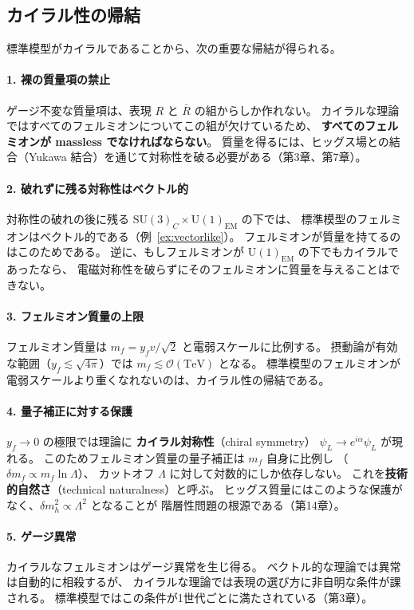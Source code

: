 \documentclass[uplatex,dvipdfmx,a4paper,11pt,openany]{jsbook}
\newcommand{\term}[2]{\textbf{#1}（#2）}
\numberwithin{equation}{chapter}
\theoremstyle{definition}
\theoremstyle{plain}
\theoremstyle{remark}
\newcommand{\SU}{\mathrm{SU}}
\newcommand{\U}{\mathrm{U}}
\begin{document}
\subsection{カイラル性の帰結}
標準模型がカイラルであることから、次の重要な帰結が得られる。
\paragraph{1. 裸の質量項の禁止}
ゲージ不変な質量項は、表現 $R$ と $\bar R$ の組からしか作れない。
カイラルな理論ではすべてのフェルミオンについてこの組が欠けているため、
\textbf{すべてのフェルミオンが massless でなければならない}。
質量を得るには、ヒッグス場との結合（Yukawa 結合）を通じて対称性を破る必要がある（第3章、第7章）。
\paragraph{2. 破れずに残る対称性はベクトル的}
対称性の破れの後に残る $\SU(3)_C\times\U(1)_{\mathrm{EM}}$ の下では、
標準模型のフェルミオンはベクトル的である（例~\ref{ex:vectorlike}）。
フェルミオンが質量を持てるのはこのためである。
逆に、もしフェルミオンが $\U(1)_{\mathrm{EM}}$ の下でもカイラルであったなら、
電磁対称性を破らずにそのフェルミオンに質量を与えることはできない。
\paragraph{3. フェルミオン質量の上限}
フェルミオン質量は $m_f=y_fv/\sqrt2$ と電弱スケールに比例する。
摂動論が有効な範囲（$y_f\lesssim\sqrt{4\pi}$）では
$m_f\lesssim\mathcal O(\mathrm{TeV})$ となる。
標準模型のフェルミオンが電弱スケールより重くなれないのは、カイラル性の帰結である。
\paragraph{4. 量子補正に対する保護}
$y_f\to0$ の極限では理論に
\term{カイラル対称性}{chiral symmetry} $\psi_L\to e^{i\alpha}\psi_L$ が現れる。
このためフェルミオン質量の量子補正は $m_f$ 自身に比例し
（$\delta m_f\propto m_f\ln\Lambda$）、
カットオフ $\Lambda$ に対して対数的にしか依存しない。
これを\term{技術的自然さ}{technical naturalness}と呼ぶ。
ヒッグス質量にはこのような保護がなく、$\delta m_h^2\propto\Lambda^2$ となることが
階層性問題の根源である（第14章）。
\paragraph{5. ゲージ異常}
カイラルなフェルミオンはゲージ異常を生じ得る。
ベクトル的な理論では異常は自動的に相殺するが、
カイラルな理論では表現の選び方に非自明な条件が課される。
標準模型ではこの条件が1世代ごとに満たされている（第3章）。
\end{document}
